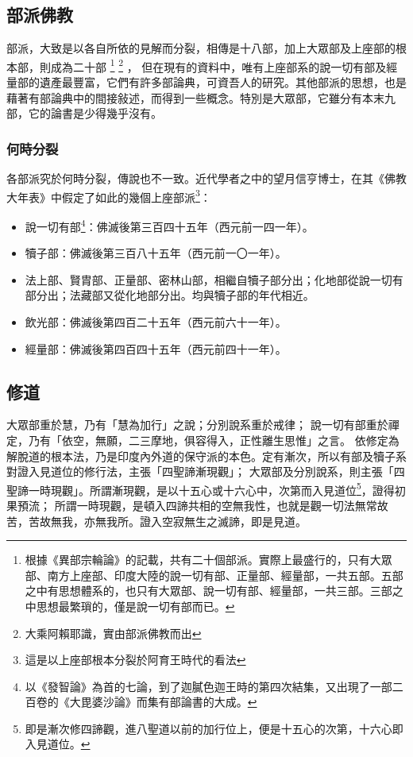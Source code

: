 \subsection{部派佛教}
部派，大致是以各自所依的見解而分裂，相傳是十八部，加上大眾部及上座部的根本部，則成為二十部
\footnote{根據《異部宗輪論》的記載，共有二十個部派。實際上最盛行的，只有大眾部、南方上座部、印度大陸的說一切有部、正量部、經量部，一共五部。五部之中有思想體系的，也只有大眾部、說一切有部、經量部，一共三部。三部之中思想最繁瑣的，僅是說一切有部而已。}
\footnote{大乘阿賴耶識，實由部派佛教而出}
，
但在現有的資料中，唯有上座部系的說一切有部及經量部的遺產最豐富，它們有許多部論典，可資吾人的研究。其他部派的思想，也是藉著有部論典中的間接敍述，而得到一些概念。特別是大眾部，它雖分有本末九部，它的論書是少得幾乎沒有。
\subsubsection{何時分裂}
各部派究於何時分裂，傳說也不一致。近代學者之中的望月信亨博士，在其《佛教大年表》中假定了如此的幾個上座部派\footnote{這是以上座部根本分裂於阿育王時代的看法}：
\begin{itemize}
  \item 說一切有部\footnote{以《發智論》為首的七論，到了迦膩色迦王時的第四次結集，又出現了一部二百卷的《大毘婆沙論》而集有部論書的大成。}：佛滅後第三百四十五年（西元前一四一年）。
  \item 犢子部：佛滅後第三百八十五年（西元前一〇一年）。
  \item 法上部、賢胄部、正量部、密林山部，相繼自犢子部分出；化地部從說一切有部分出；法藏部又從化地部分出。均與犢子部的年代相近。
  \item 飲光部：佛滅後第四百二十五年（西元前六十一年）。
  \item 經量部：佛滅後第四百四十五年（西元前四十一年）。
\end{itemize}

\subsection{修道}
大眾部重於慧，乃有「慧為加行」之說；分別說系重於戒律；
說一切有部重於禪定，乃有「依空，無願，二三摩地，俱容得入，正性離生思惟」之言。
依修定為解脫道的根本法，乃是印度內外道的保守派的本色。定有漸次，所以有部及犢子系對證入見道位的修行法，主張「四聖諦漸現觀」；
大眾部及分別說系，則主張「四聖諦一時現觀」。所謂漸現觀，是以十五心或十六心中，次第而入見道位\footnote{即是漸次修四諦觀，進八聖道以前的加行位上，便是十五心的次第，十六心即入見道位。}，證得初果預流；
所謂一時現觀，是頓入四諦共相的空無我性，也就是觀一切法無常故苦，苦故無我，亦無我所。證入空寂無生之滅諦，即是見道。


